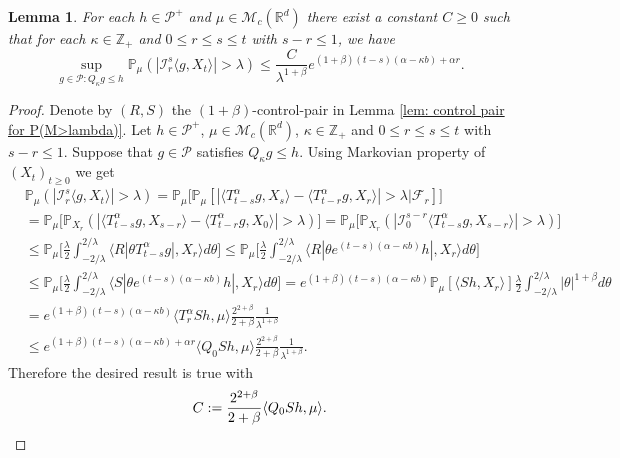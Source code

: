\documentclass[12pt,oneside,english]{amsart}
\theoremstyle{plain}
\newtheorem{lem}[thm]{Lemma}
\theoremstyle{definition}
\numberwithin{equation}{section}
\begin{document}
\begin{lem}\label{lem: temp}
	For each $h \in \mathcal P^+$ and $\mu \in \mathcal M_c(\mathbb{R}^d)$ there exist a constant $C \geq 0$ such that for each $\kappa \in \mathbb Z_+ $ and $0\leq r\leq s\leq t$ with $s-r \leq 1$, we have
\[
    \sup_{g \in \mathcal P: Q_\kappa g\leq h}\mathbb P_{\mu}(|\mathcal I_r^s\langle g, X_t\rangle|>\lambda)
    \leq \frac{ C}{\lambda^{1+\beta}} e^{(1+\beta)(t-s)(\alpha- \kappa b)+ \alpha r}.
\]
\end{lem}
\begin{proof}
    Denote by $(R,S)$ the $(1+\beta)$-control-pair in Lemma \ref{lem: control pair for P(M>lambda)}.
    Let $h \in \mathcal P^+$, $\mu \in \mathcal M_c(\mathbb{R}^d)$, $\kappa \in \mathbb Z_+ $ and $0\leq r\leq s\leq t$ with $s-r \leq 1$.
    Suppose that $g\in \mathcal P$ satisfies $Q_\kappa g \leq h$.
    Using Markovian property of $(X_t)_{t\geq 0}$ we get
\begin{align}
    &\mathbb P_{\mu}(|\mathcal I_r^s\langle g, X_t\rangle|>\lambda)
    = \mathbb P_\mu \big[\mathbb P_\mu[|\langle T_{t-s}^\alpha g, X_{s}\rangle - \langle T_{t-r}^\alpha g, X_{r}\rangle|> \lambda\big| \mathscr F_r]\big]
    \\&= \mathbb P_\mu \big[\mathbb P_{X_r}(|\langle T_{t-s}^\alpha g, X_{s-r}\rangle - \langle T_{t-r}^\alpha g, X_{0}\rangle|> \lambda)\big]
    = \mathbb P_\mu \big[\mathbb P_{X_r}(|\mathcal I_0^{s-r}\langle T_{t-s}^\alpha g, X_{s-r}\rangle |> \lambda)\big]
    \\&\leq \mathbb P_\mu \Big[ \frac{\lambda}{2}\int_{-2/\lambda}^{2/\lambda}\langle R|\theta T^\alpha_{t-s}g|,X_r\rangle d\theta \Big]
    \leq \mathbb P_\mu \Big[ \frac{\lambda}{2}\int_{-2/\lambda}^{2/\lambda}\langle R|\theta e^{(t-s)(\alpha- \kappa b)}h|,X_r\rangle d\theta \Big]
	\\&\leq \mathbb P_\mu \Big[ \frac{\lambda}{2}\int_{-2/\lambda}^{2/\lambda}\langle S|\theta e^{(t-s)(\alpha- \kappa b)}h|,X_r\rangle d\theta \Big]
    = e^{(1+\beta)(t-s)(\alpha- \kappa b)} \mathbb P_\mu [ \langle Sh,X_r\rangle ] \frac{\lambda}{2}\int_{-2/\lambda}^{2/\lambda}|\theta|^{1+\beta}d\theta
    \\& = e^{(1+\beta)(t-s)(\alpha- \kappa b)} \langle T_r^\alpha Sh,\mu\rangle  \frac{2^{2+\beta}}{2+\beta}\frac{1}{\lambda^{1+\beta}}
    \\&\leq e^{(1+\beta)(t-s)(\alpha- \kappa b)+ \alpha r} \langle Q_0 Sh,\mu\rangle  \frac{2^{2+\beta}}{2+\beta}\frac{1}{\lambda^{1+\beta}}.
\end{align}
    Therefore the desired result is true with
\[
    C := \frac{2^{2+\beta}}{2+\beta}\langle Q_0Sh, \mu\rangle.
    \qedhere
\]
\end{proof}
\end{document}
